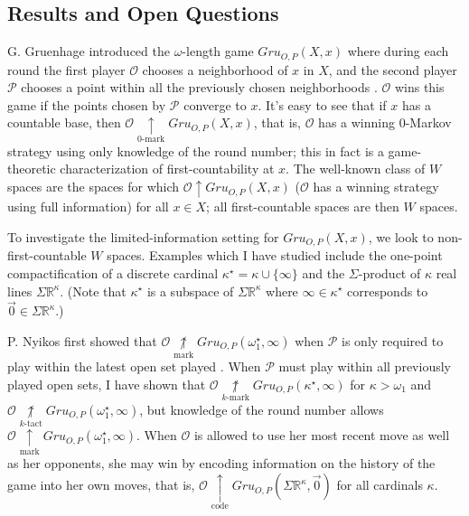 \documentclass[11pt]{amsart}
\theoremstyle{plain}
\newcommand{\win}{\uparrow}
\newcommand{\markwin}{\underset{\text{mark}}{\uparrow}}
\newcommand{\kmarkwin}[1]{\underset{#1\text{-mark}}{\uparrow}}
\newcommand{\codewin}{\underset{\text{code}}{\uparrow}}
\newcommand{\notmarkwin}{\underset{\text{mark}}{\not\uparrow}}
\newcommand{\notkmarkwin}[1]{\underset{#1\text{-mark}}{\not\uparrow}}
\newcommand{\notktactwin}[1]{\underset{#1\text{-tact}}{\not\uparrow}}
\newcommand{\oneptcomp}[1]{#1^\star}
\newcommand{\gruConGame}[2]{Gru_{O,P}(#1,#2)}
\newcommand{\<}{\langle}
\renewcommand{\>}{\rangle}
\newcommand{\mb}[1]{\mathbb{#1}}
\newcommand{\pl}[1]{\mathscr{#1}}
\begin{document}

\subsection*{Results and Open Questions}

G. Gruenhage introduced
the $\omega$-length game $\gruConGame{X}{x}$ where during
each round the first player $\pl O$ chooses a neighborhood of $x$ in $X$, and
the second player $\pl P$ chooses a point within all the previously chosen
neighborhoods \cite{MR0413049}.
$\pl O$ wins this game if the points chosen by $\pl P$
converge to $x$. It's easy to see that if $x$ has a countable base,
then $\pl O \kmarkwin0 \gruConGame{X}{x}$, that is, $\pl O$ has a winning
$0$-Markov strategy using only knowledge of the round number; this in fact is
a game-theoretic characterization of first-countability at $x$. The well-known
class of $W$ spaces are the spaces for which $\pl O \win \gruConGame{X}{x}$
($\pl O$ has a winning strategy using full information)
for all $x\in X$; all first-countable spaces are then $W$ spaces.

To investigate the limited-information setting for $\gruConGame{X}{x}$, we look
to non-first-countable $W$ spaces. Examples which I have studied include the
one-point compactification of a discrete cardinal
$\oneptcomp\kappa=\kappa\cup\{\infty\}$ and the
$\Sigma$-product of $\kappa$ real lines $\Sigma\mb R^\kappa$. (Note that
$\oneptcomp\kappa$ is a subspace of $\Sigma\mb R^\kappa$ where
$\infty\in\oneptcomp\kappa$ corresponds to $\vec0\in\Sigma\mb R^\kappa$.)

P. Nyikos first showed that
$\pl O\notmarkwin\gruConGame{\oneptcomp\omega_1}{\infty}$ when $\pl P$ is only
required to play within the latest open set played \cite{MR1031771}.
When $\pl P$ must play within all previously played open sets, I have shown
that $\pl O\notkmarkwin{k}\gruConGame{\oneptcomp\kappa}{\infty}$ for
$\kappa>\omega_1$ and
$\pl O\notktactwin{k}\gruConGame{\oneptcomp\omega_1}{\infty}$, but knowledge
of the round number allows
$\pl O\markwin\gruConGame{\oneptcomp\omega_1}{\infty}$. When $\pl O$
is allowed to use her most recent move as well as her opponents,
she may win by encoding information on the history of the game into
her own moves, that is,
$\pl O\codewin\gruConGame{\Sigma\mb R^\kappa}{\vec0}$ for all cardinals
$\kappa$.
\end{document}
